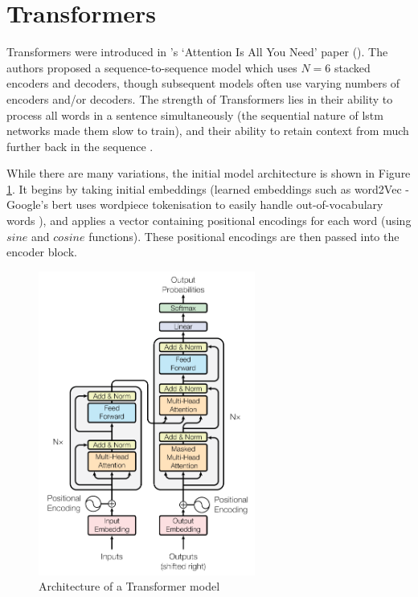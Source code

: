 

\section{Transformers}\label{sec:background_transformers}
Transformers were introduced in \citeauthor{vaswani2017attention}'s `Attention Is All You Need' paper (\citeyear{vaswani2017attention}). The authors proposed a sequence-to-sequence model which uses $N=6$ stacked encoders and decoders, though subsequent models often use varying numbers of encoders and/or decoders. The strength of Transformers lies in their ability to process all words in a sentence simultaneously (the sequential nature of \acrshort{lstm} networks made them slow to train), and their ability to retain context from much further back in the sequence \cite{vaswani2017attention}.

While there are many variations, the initial model architecture is shown in Figure \ref{fig:transformer_architecture}. It begins by taking initial embeddings (learned embeddings such as word2Vec - Google's \acrshort{bert} uses wordpiece tokenisation to easily handle out-of-vocabulary words \citep{wu2016googles}), and applies a vector containing positional encodings for each word (using $sine$ and $cosine$ functions). These positional encodings are then passed into the encoder block.

\begin{figure}[h]
    \centering
    \includegraphics[height=10cm,trim={0 0 0cm 0cm},clip]{paper/images/transformer.png}
    \caption{Architecture of a Transformer model \citep{vaswani2017attention}}
    \label{fig:transformer_architecture}
\end{figure}

